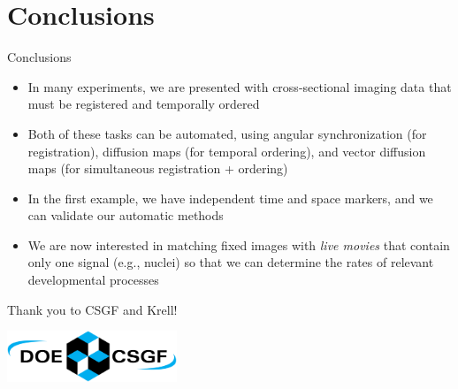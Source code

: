 \documentclass[10pt,aspectratio=169]{beamer}
\begin{document}
\section{Conclusions}

\begin{frame}{Conclusions}

\begin{itemize}
\item In many experiments, we are presented with cross-sectional imaging data that must be registered and temporally ordered
\item Both of these tasks can be automated, using angular synchronization (for registration), diffusion maps (for temporal ordering), and vector diffusion maps (for simultaneous registration + ordering)
\item In the first example, we have independent time and space markers, and we can validate our automatic methods
\item We are now interested in matching fixed images with {\em live movies} that contain only one signal (e.g., nuclei) so that we can determine the rates of relevant developmental processes
\end{itemize}

\vspace{0.5in}
\begin{center}
{\Large Thank you to CSGF and Krell!}

\includegraphics[width=2in]{CSGF_horiz_1200x360}
\end{center}


\end{frame}
\end{document}
